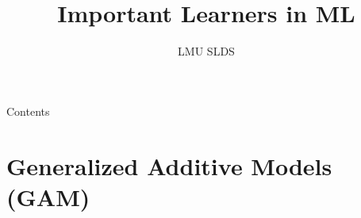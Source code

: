 \documentclass[11pt, t, aspectratio=169]{beamer}
\title{Important Learners in ML}
\institute{\href{https://compstat-lmu.github.io/lecture_i2ml/}{
compstat-lmu.github.io/lecture\_i2ml}}
\author{LMU SLDS}
\date{}
\begin{document}
\lecturechapter{}

\begin{frame}{Contents}
  \tableofcontents
\end{frame}

\footnotesize


%
%
%
%
% 

\section{Generalized Additive Models (GAM)}


%
%
%
%
%
%
%
%
%
%
%
%
%

\endlecture
\end{document}
